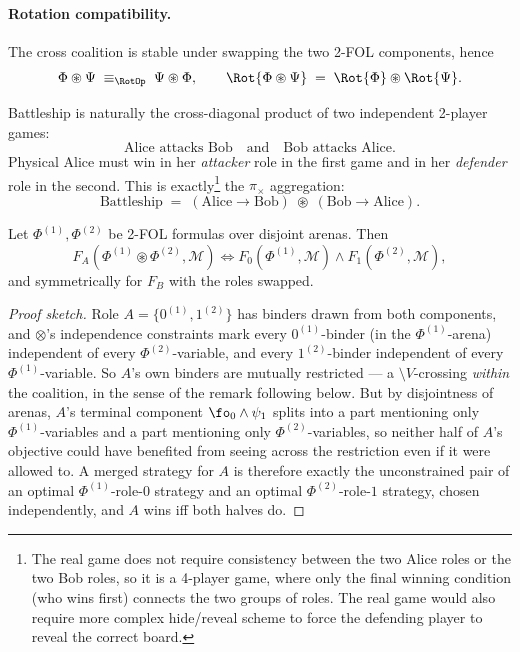 \paragraph{Rotation compatibility.}
The cross coalition is stable under swapping the two 2-FOL components, hence
\[
\Phi \circledast \Psi \;\equiv_\RotOp\; \Psi \circledast \Phi,
\qquad
\Rot{\Phi \circledast \Psi} \;=\; \Rot{\Phi} \circledast \Rot{\Psi}.
\]

\begin{example}[Battleship]
Battleship is naturally the cross-diagonal product of two independent
2-player games:
\[
\text{Alice attacks Bob} \quad\text{and}\quad \text{Bob attacks Alice}.
\]
Physical Alice must win in her \emph{attacker} role in the first game
and in her \emph{defender} role in the second. This is exactly\footnote{The real game does not require consistency between the two Alice roles or the two Bob roles, so it is a 4-player game, where only the final winning condition (who wins first) connects the two groups of roles. The real game would also require more complex hide/reveal scheme to force the defending player to reveal the correct board.} the
$\pi_{\times}$ aggregation:
\[
\text{Battleship} \;=\;
(\text{Alice}\to\text{Bob}) \;\circledast\; (\text{Bob}\to\text{Alice}).
\]
\end{example}

\begin{proposition}
\label{prop:cross-diagonal-forceability}
Let $\Phi^{(1)},\Phi^{(2)}$ be 2-FOL formulas over disjoint arenas. Then
\[
F_A(\Phi^{(1)} \circledast \Phi^{(2)}, \mathcal M)
\iff
F_0(\Phi^{(1)}, \mathcal M) \wedge F_1(\Phi^{(2)}, \mathcal M),
\]
and symmetrically for $F_B$ with the roles swapped.
\end{proposition}
\begin{proof}[Proof sketch]
Role $A=\{0^{(1)},1^{(2)}\}$ has binders drawn from both components, and
$\otimes$'s independence constraints mark every $0^{(1)}$-binder (in the
$\Phi^{(1)}$-arena) independent of every $\Phi^{(2)}$-variable, and every
$1^{(2)}$-binder independent of every $\Phi^{(1)}$-variable. So $A$'s own
binders are mutually restricted --- a $\setminus V$-crossing \emph{within} the
coalition, in the sense of the remark following
 below. But by disjointness of arenas,
$A$'s terminal component $\fo_0\wedge\psi_1$ splits into a part mentioning
only $\Phi^{(1)}$-variables and a part mentioning only $\Phi^{(2)}$-variables,
so neither half of $A$'s objective could have benefited from seeing across the
restriction even if it were allowed to. A merged strategy for $A$ is therefore
exactly the unconstrained pair of an optimal $\Phi^{(1)}$-role-$0$ strategy and
an optimal $\Phi^{(2)}$-role-$1$ strategy, chosen independently, and $A$ wins
iff both halves do.
\end{proof}

